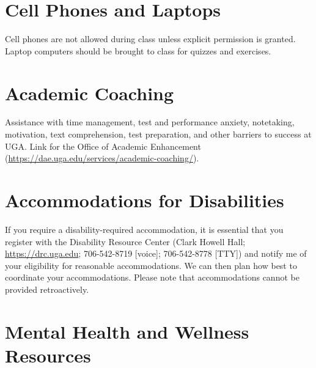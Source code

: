 \documentclass[12pt]{article}
\begin{document}
\section*{\normalsize Cell Phones and Laptops}
\vspace{-4mm}
Cell phones are not allowed during class unless explicit permission is
granted. Laptop computers should be brought to class for quizzes and
exercises.


\vspace{-2mm}
\section*{\normalsize Academic Coaching}
\vspace{-4mm}

Assistance with time management, test and performance anxiety,
notetaking, motivation, text comprehension, test preparation, and
other barriers to success at UGA. Link for the Office of Academic
Enhancement (\url{https://dae.uga.edu/services/academic-coaching/}). 

\vspace{-2mm}
\section*{\normalsize Accommodations for Disabilities}
\vspace{-4mm}

If you require a disability-required accommodation, it is essential
that you register with the Disability Resource Center (Clark Howell
Hall; \url{https://drc.uga.edu}; 706-542-8719 [voice]; 706-542-8778 [TTY])
and notify me of your eligibility for reasonable accommodations. We
can then plan how best to coordinate your accommodations. Please note
that accommodations cannot be provided retroactively.



\vspace{-2mm}
\section*{\normalsize Mental Health and Wellness Resources}
\vspace{-4mm}
\end{document}
